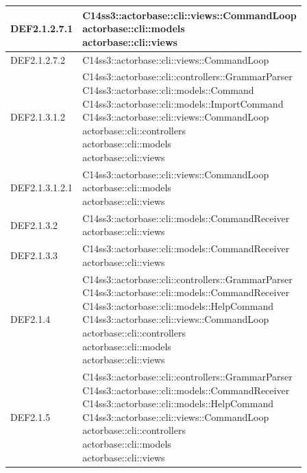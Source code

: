 \documentclass{scalatekids-article}
\begin{document}
\begin{longtable}[H]{|p{4.5cm}|p{13cm}|}
\hline
DEF2.1.2.7.1 & \multiLineCell[t]{C14ss3::actorbase::cli::views::CommandLoop\\actorbase::cli::models\\actorbase::cli::views\\}\\
\hline
DEF2.1.2.7.2 & \multiLineCell[t]{C14ss3::actorbase::cli::views::CommandLoop\\}\\
\hline
DEF2.1.3.1.2 & \multiLineCell[t]{C14ss3::actorbase::cli::controllers::GrammarParser\\C14ss3::actorbase::cli::models::Command\\C14ss3::actorbase::cli::models::ImportCommand\\C14ss3::actorbase::cli::views::CommandLoop\\actorbase::cli::controllers\\actorbase::cli::models\\actorbase::cli::views\\}\\
\hline
DEF2.1.3.1.2.1 & \multiLineCell[t]{C14ss3::actorbase::cli::views::CommandLoop\\actorbase::cli::models\\actorbase::cli::views\\}\\
\hline
DEF2.1.3.2 & \multiLineCell[t]{C14ss3::actorbase::cli::models::CommandReceiver\\actorbase::cli::views\\}\\
\hline
DEF2.1.3.3 & \multiLineCell[t]{C14ss3::actorbase::cli::models::CommandReceiver\\actorbase::cli::views\\}\\
\hline
DEF2.1.4 & \multiLineCell[t]{C14ss3::actorbase::cli::controllers::GrammarParser\\C14ss3::actorbase::cli::models::CommandReceiver\\C14ss3::actorbase::cli::models::HelpCommand\\C14ss3::actorbase::cli::views::CommandLoop\\actorbase::cli::controllers\\actorbase::cli::models\\actorbase::cli::views\\}\\
\hline
DEF2.1.5 & \multiLineCell[t]{C14ss3::actorbase::cli::controllers::GrammarParser\\C14ss3::actorbase::cli::models::CommandReceiver\\C14ss3::actorbase::cli::models::HelpCommand\\C14ss3::actorbase::cli::views::CommandLoop\\actorbase::cli::controllers\\actorbase::cli::models\\actorbase::cli::views\\}\\

\end{longtable}
\end{document}
